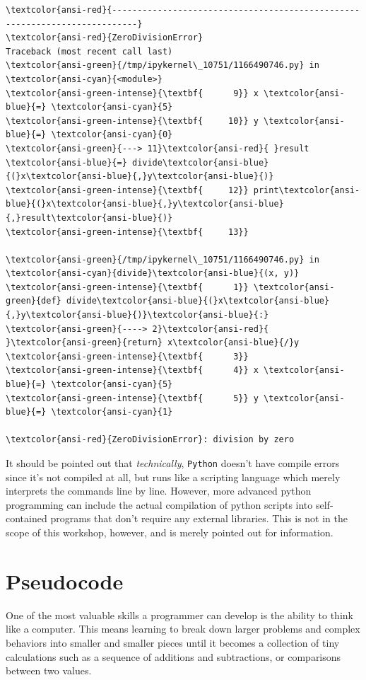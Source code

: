     \begin{Verbatim}[commandchars=\\\{\}, frame=single, framerule=2mm, rulecolor=\color{outerrorbackground}]
\textcolor{ansi-red}{---------------------------------------------------------------------------}
\textcolor{ansi-red}{ZeroDivisionError}                         Traceback (most recent call last)
\textcolor{ansi-green}{/tmp/ipykernel\_10751/1166490746.py} in \textcolor{ansi-cyan}{<module>}
\textcolor{ansi-green-intense}{\textbf{      9}} x \textcolor{ansi-blue}{=} \textcolor{ansi-cyan}{5}
\textcolor{ansi-green-intense}{\textbf{     10}} y \textcolor{ansi-blue}{=} \textcolor{ansi-cyan}{0}
\textcolor{ansi-green}{---> 11}\textcolor{ansi-red}{ }result \textcolor{ansi-blue}{=} divide\textcolor{ansi-blue}{(}x\textcolor{ansi-blue}{,}y\textcolor{ansi-blue}{)}
\textcolor{ansi-green-intense}{\textbf{     12}} print\textcolor{ansi-blue}{(}x\textcolor{ansi-blue}{,}y\textcolor{ansi-blue}{,}result\textcolor{ansi-blue}{)}
\textcolor{ansi-green-intense}{\textbf{     13}} 

\textcolor{ansi-green}{/tmp/ipykernel\_10751/1166490746.py} in \textcolor{ansi-cyan}{divide}\textcolor{ansi-blue}{(x, y)}
\textcolor{ansi-green-intense}{\textbf{      1}} \textcolor{ansi-green}{def} divide\textcolor{ansi-blue}{(}x\textcolor{ansi-blue}{,}y\textcolor{ansi-blue}{)}\textcolor{ansi-blue}{:}
\textcolor{ansi-green}{----> 2}\textcolor{ansi-red}{     }\textcolor{ansi-green}{return} x\textcolor{ansi-blue}{/}y
\textcolor{ansi-green-intense}{\textbf{      3}} 
\textcolor{ansi-green-intense}{\textbf{      4}} x \textcolor{ansi-blue}{=} \textcolor{ansi-cyan}{5}
\textcolor{ansi-green-intense}{\textbf{      5}} y \textcolor{ansi-blue}{=} \textcolor{ansi-cyan}{1}

\textcolor{ansi-red}{ZeroDivisionError}: division by zero
    \end{Verbatim}

    It should be pointed out that \emph{technically}, \texttt{Python}
doesn't have compile errors since it's not compiled at all, but runs
like a scripting language which merely interprets the commands line by
line. However, more advanced python programming can include the actual
compilation of python scripts into self-contained programs that don't
require any external libraries. This is not in the scope of this
workshop, however, and is merely pointed out for information.
\section{Pseudocode}
One of the most valuable skills a programmer can develop is the ability
to think like a computer. This means learning to break down larger
problems and complex behaviors into smaller and smaller pieces until it
becomes a collection of tiny calculations such as a sequence of
additions and subtractions, or comparisons between two values.

